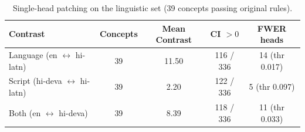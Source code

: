 \begin{table}[t]
\centering
\small
\begin{tabular}{lcccc}
\toprule
\textbf{Contrast} & \textbf{Concepts} & \textbf{Mean Contrast} & \textbf{CI $>0$} & \textbf{FWER heads} \\
\midrule
Language (en $\leftrightarrow$ hi-latn) & 39 & 11.50 & 116 / 336 & 14 (thr 0.017) \\
Script (hi-deva $\leftrightarrow$ hi-latn) & 39 & 2.20 & 122 / 336 & 5 (thr 0.097) \\
Both (en $\leftrightarrow$ hi-deva) & 39 & 8.39 & 118 / 336 & 11 (thr 0.033) \\
\bottomrule
\end{tabular}
\caption{Single-head patching on the linguistic set (39 concepts passing original rules).}
\label{tab:heads_ling}
\end{table}
